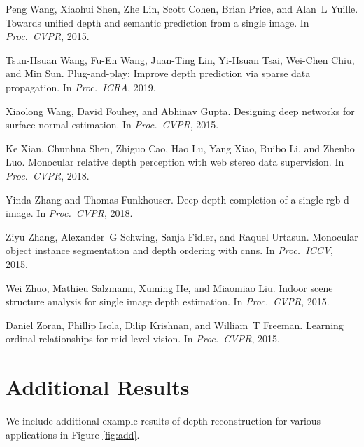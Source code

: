 \documentclass[10pt,twocolumn,letterpaper]{article}
\begin{document}
{\begin{thebibliography}{10}
Peng Wang, Xiaohui Shen, Zhe Lin, Scott Cohen, Brian Price, and Alan~L Yuille.
\newblock Towards unified depth and semantic prediction from a single image.
\newblock In {\em Proc.~CVPR}, 2015.

Tsun-Hsuan Wang, Fu-En Wang, Juan-Ting Lin, Yi-Hsuan Tsai, Wei-Chen Chiu, and
  Min Sun.
\newblock Plug-and-play: Improve depth prediction via sparse data propagation.
\newblock In {\em Proc.~ICRA}, 2019.

\newpage

Xiaolong Wang, David Fouhey, and Abhinav Gupta.
\newblock Designing deep networks for surface normal estimation.
\newblock In {\em Proc.~CVPR}, 2015.

Ke Xian, Chunhua Shen, Zhiguo Cao, Hao Lu, Yang Xiao, Ruibo Li, and Zhenbo Luo.
\newblock Monocular relative depth perception with web stereo data supervision.
\newblock In {\em Proc.~CVPR}, 2018.

Yinda Zhang and Thomas Funkhouser.
\newblock Deep depth completion of a single rgb-d image.
\newblock In {\em Proc.~CVPR}, 2018.

Ziyu Zhang, Alexander~G Schwing, Sanja Fidler, and Raquel Urtasun.
\newblock Monocular object instance segmentation and depth ordering with cnns.
\newblock In {\em Proc.~ICCV}, 2015.

Wei Zhuo, Mathieu Salzmann, Xuming He, and Miaomiao Liu.
\newblock Indoor scene structure analysis for single image depth estimation.
\newblock In {\em Proc.~CVPR}, 2015.

Daniel Zoran, Phillip Isola, Dilip Krishnan, and William~T Freeman.
\newblock Learning ordinal relationships for mid-level vision.
\newblock In {\em Proc.~CVPR}, 2015.

\end{thebibliography}
 }

\clearpage

\newcommand{\conv}[1]{conv #1#1}
\newcommand{\dconv}[1]{conv\_transpose #1#1}
\onecolumn

\appendix


\section{Additional Results}

We include additional example results of depth reconstruction for various applications in Figure \ref{fig:add}.
\end{document}
